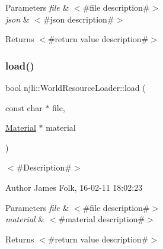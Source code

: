 \begin{DoxyParams}{Parameters}
{\em file} & $<$\#file description\#$>$ \\
\hline
{\em json} & $<$\#json description\#$>$\\
\hline
\end{DoxyParams}
\begin{DoxyReturn}{Returns}
$<$\#return value description\#$>$ 
\end{DoxyReturn}
\mbox{\label{classnjli_1_1_world_resource_loader_a8ea241bd485254b9edf6d3a32b1532db}} 
\subsubsection{\texorpdfstring{load()}{load()}\hspace{0.1cm}{\footnotesize\ttfamily [10/13]}}
{\footnotesize\ttfamily bool njli\+::\+World\+Resource\+Loader\+::load (\begin{DoxyParamCaption}\item[{const char $\ast$}]{file,  }\item[{\mbox{\hyperlink{classnjli_1_1_material}{Material}} $\ast$}]{material }\end{DoxyParamCaption})}



$<$\#\+Description\#$>$ 

\begin{DoxyAuthor}{Author}
James Folk, 16-\/02-\/11 18\+:02\+:23
\end{DoxyAuthor}

\begin{DoxyParams}{Parameters}
{\em file} & $<$\#file description\#$>$ \\
\hline
{\em material} & $<$\#material description\#$>$\\
\hline
\end{DoxyParams}
\begin{DoxyReturn}{Returns}
$<$\#return value description\#$>$ 
\end{DoxyReturn}
\mbox{\label{classnjli_1_1_world_resource_loader_a97c72c0dc49dc9be8ec668fbbfbcf9a0}} 
